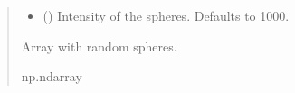 \documentclass[letterpaper,10pt,english]{sphinxmanual}
\begin{document}
\begin{fulllineitems}
\begin{quote}
\begin{description}
\begin{itemize}
\item {} 
\sphinxAtStartPar
{} (\sphinxstyleliteralemphasis{\sphinxupquote{, }}) \textendash{} Intensity of the spheres. Defaults to 1000.

\end{itemize}

\sphinxAtStartPar
Array with random spheres.

\sphinxAtStartPar
np.ndarray

\end{description}\end{quote}

\end{fulllineitems}

\end{document}
